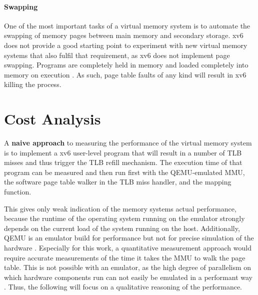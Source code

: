 \paragraph{Swapping} One of the most important tasks of a virtual memory system is to automate the swapping of memory pages between main memory and secondary storage. xv6 does not provide a good starting point to experiment with new virtual memory systems that also fulfil that requirement, as xv6 does not implement page swapping. Programs are completely held in memory and loaded completely into memory on execution \cite{cox2011xv6}. As such, page table faults of any kind will result in xv6 killing the process.




\section{Cost Analysis}

A \textbf{naive approach} to measuring the performance of the virtual memory system is to implement a xv6 user-level program that will result in a number of TLB misses and thus trigger the TLB refill mechanism. The execution time of that program can be measured and then run first with the QEMU-emulated MMU, the software page table walker in the TLB miss handler, and the mapping function.

This gives only weak indication of the memory systems actual performance, because the runtime of the operating system running on the emulator strongly depends on the current load of the system running on the host. Additionally, QEMU is an emulator build for performance but not for precise simulation of the hardware \cite{bellard2005qemu}. Especially for this work, a quantitative measurement approach would require accurate measurements of the time it takes the MMU to walk the page table. This is not possible with an emulator, as the high degree of parallelism on which hardware components run can not easily be emulated in a performant way \cite{chen2010emulator}. Thus, the following will focus on a qualitative reasoning of the performance.

